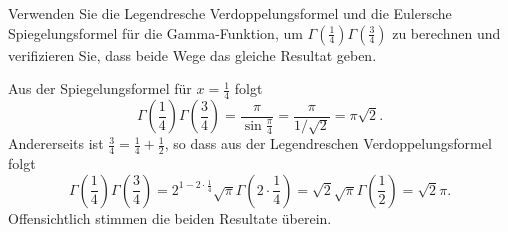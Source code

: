 Verwenden Sie die Legendresche Verdoppelungsformel und
die Eulersche Spiegelungsformel für die Gamma-Funktion,
um $\Gamma(\frac14)\Gamma(\frac34)$ zu berechnen und
verifizieren Sie, dass beide Wege das gleiche Resultat geben.

\begin{loesung}
Aus der Spiegelungsformel für $x=\frac14$ folgt
\[
\Gamma({\textstyle\frac14})\Gamma({\textstyle\frac34})
=
\frac{\pi}{\sin\frac{\pi}4}
=
\frac{\pi}{1/\sqrt{2}}
=
\pi\sqrt{2}.
\]
Andererseits ist $\frac34=\frac14+\frac12$, so dass aus der Legendreschen
Verdoppelungsformel folgt
\[
\Gamma({\textstyle\frac14})\Gamma({\textstyle\frac34})
=
2^{1-2\cdot \frac14}\sqrt{\pi}\Gamma(2\cdot {\textstyle\frac14})
=
\sqrt{2}
\sqrt{\pi}\Gamma({\textstyle\frac12})
=
\sqrt{2}
\pi.
\]
Offensichtlich stimmen die beiden Resultate überein.
\end{loesung}
